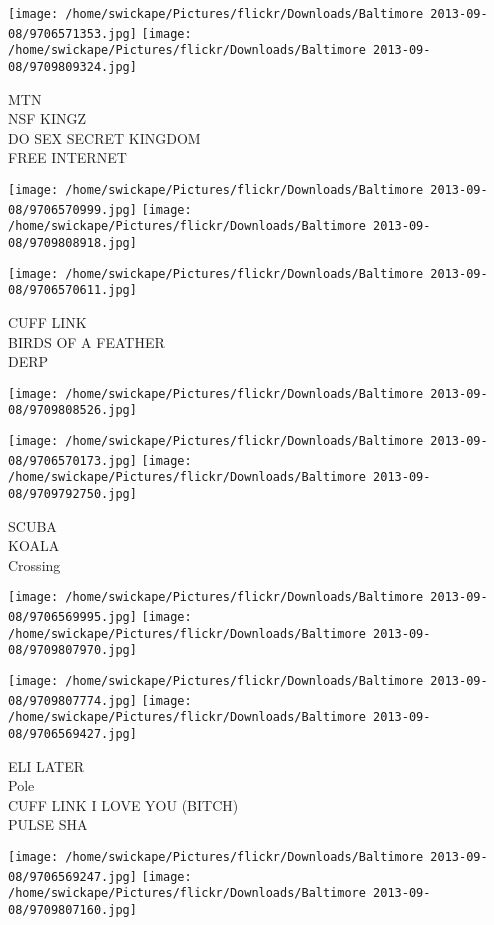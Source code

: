 \documentclass[10pt,letterpaper]{article}
\begin{document}
\texttt{[image: /home/swickape/Pictures/flickr/Downloads/Baltimore 2013-09-08/9706571353.jpg]}
\texttt{[image: /home/swickape/Pictures/flickr/Downloads/Baltimore 2013-09-08/9709809324.jpg]}

MTN\\
NSF KINGZ\\
DO SEX SECRET KINGDOM\\
FREE INTERNET
\pagebreak

\texttt{[image: /home/swickape/Pictures/flickr/Downloads/Baltimore 2013-09-08/9706570999.jpg]}
\texttt{[image: /home/swickape/Pictures/flickr/Downloads/Baltimore 2013-09-08/9709808918.jpg]}

\texttt{[image: /home/swickape/Pictures/flickr/Downloads/Baltimore 2013-09-08/9706570611.jpg]}

CUFF LINK\\
BIRDS OF A FEATHER\\
DERP
\pagebreak

\texttt{[image: /home/swickape/Pictures/flickr/Downloads/Baltimore 2013-09-08/9709808526.jpg]}

\vspace{0.25in}
\texttt{[image: /home/swickape/Pictures/flickr/Downloads/Baltimore 2013-09-08/9706570173.jpg]}
\texttt{[image: /home/swickape/Pictures/flickr/Downloads/Baltimore 2013-09-08/9709792750.jpg]}

SCUBA\\
KOALA\\
Crossing
\pagebreak

\texttt{[image: /home/swickape/Pictures/flickr/Downloads/Baltimore 2013-09-08/9706569995.jpg]}
\texttt{[image: /home/swickape/Pictures/flickr/Downloads/Baltimore 2013-09-08/9709807970.jpg]}

\texttt{[image: /home/swickape/Pictures/flickr/Downloads/Baltimore 2013-09-08/9709807774.jpg]}
\texttt{[image: /home/swickape/Pictures/flickr/Downloads/Baltimore 2013-09-08/9706569427.jpg]}

ELI LATER\\
Pole\\
CUFF LINK I LOVE YOU (BITCH)\\
PULSE SHA
\pagebreak

\texttt{[image: /home/swickape/Pictures/flickr/Downloads/Baltimore 2013-09-08/9706569247.jpg]}
\texttt{[image: /home/swickape/Pictures/flickr/Downloads/Baltimore 2013-09-08/9709807160.jpg]}
\end{document}

